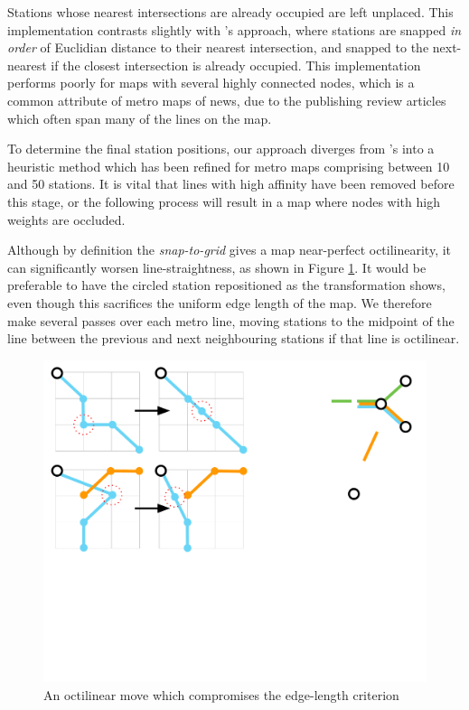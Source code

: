 Stations whose nearest intersections are already occupied are left unplaced. This implementation contrasts slightly with \citeauthor{AutomaticMetroMapLayoutThesis}'s approach, where stations are snapped \textit{in order} of Euclidian distance to their nearest intersection, and snapped to the next-nearest if the closest intersection is already occupied. This implementation performs poorly for maps with several highly connected nodes, which is a common attribute of metro maps of news, due to the publishing review articles which often span many of the lines on the map.

To determine the final station positions, our approach diverges from \citeauthor{AutomaticMetroMapLayoutThesis}'s into a heuristic method which has been refined for metro maps comprising between 10 and 50 stations. It is vital that lines with high affinity have been removed before this stage, or the following process will result in a map where nodes with high weights are occluded.

Although by definition the \textit{snap-to-grid} gives a map near-perfect octilinearity, it can significantly worsen line-straightness, as shown in Figure \ref{fig:aoct}. It would be preferable to have the circled station repositioned as the transformation shows, even though this sacrifices the uniform edge length of the map. We therefore make several passes over each metro line, moving stations to the midpoint of the line between the previous and next neighbouring stations if that line is octilinear.
\begin{figure}[htbp!]
	\centering
	\includegraphics[width=.8\textwidth]{img/implementation/averagingoctilinear.pdf}
	\caption{An octilinear move which compromises the edge-length criterion}
	\label{fig:aoct}
\end{figure}

